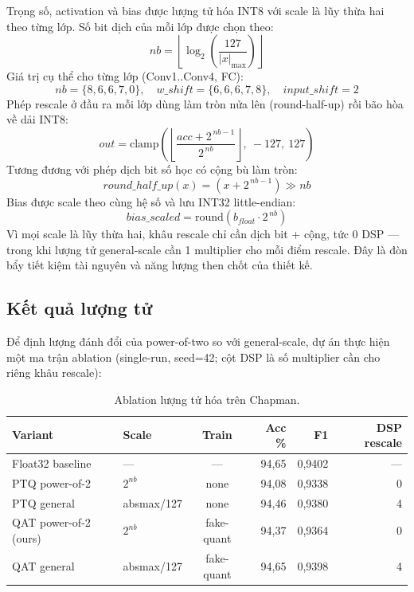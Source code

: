 \documentclass[12pt,a4paper]{article}
\begin{document}
Trọng số, activation và bias được lượng tử hóa INT8 với scale là lũy thừa hai theo từng lớp.
Số bit dịch của mỗi lớp được chọn theo:
\begin{equation}
  nb = \left\lfloor \log_2\!\left(\frac{127}{|x|_{\max}}\right) \right\rfloor
\end{equation}
Giá trị cụ thể cho từng lớp (Conv1..Conv4, FC):
\begin{equation}
  nb = \{8,6,6,7,0\}, \quad w\_shift = \{6,6,6,7,8\}, \quad input\_shift = 2
\end{equation}
Phép rescale ở đầu ra mỗi lớp dùng làm tròn nửa lên (round-half-up) rồi bão hòa về dải INT8:
\begin{equation}
  out = \mathrm{clamp}\!\left( \left\lfloor \frac{acc + 2^{\,nb-1}}{2^{\,nb}} \right\rfloor,\ -127,\ 127 \right)
\end{equation}
Tương đương với phép dịch bit số học có cộng bù làm tròn:
\begin{equation}
  round\_half\_up(x) = (x + 2^{\,nb-1}) \gg nb
\end{equation}
Bias được scale theo cùng hệ số và lưu INT32 little-endian:
\begin{equation}
  bias\_scaled = \mathrm{round}\!\left( b_{float} \cdot 2^{\,nb} \right)
\end{equation}
Vì mọi scale là lũy thừa hai, khâu rescale chỉ cần dịch bit + cộng, tức 0 DSP --- trong khi
lượng tử general-scale cần 1 multiplier cho mỗi điểm rescale. Đây là đòn bẩy tiết kiệm tài
nguyên và năng lượng then chốt của thiết kế.

\subsection{Kết quả lượng tử}

Để định lượng đánh đổi của power-of-two so với general-scale, dự án thực hiện một ma trận
ablation (single-run, seed=42; cột DSP là số multiplier cần cho riêng khâu rescale):

\begin{table}[h]
\centering
\caption{Ablation lượng tử hóa trên Chapman.}
\begin{tabular}{llcrrr}
\toprule
\textbf{Variant} & \textbf{Scale} & \textbf{Train} & \textbf{Acc \%} & \textbf{F1} & \textbf{DSP rescale}\\
\midrule
Float32 baseline & --- & --- & 94,65 & 0,9402 & ---\\
PTQ power-of-2 & $2^{nb}$ & none & 94,08 & 0,9338 & 0\\
PTQ general & absmax/127 & none & 94,46 & 0,9380 & 4\\
QAT power-of-2 (ours) & $2^{nb}$ & fake-quant & 94,37 & 0,9364 & 0\\
QAT general & absmax/127 & fake-quant & 94,65 & 0,9398 & 4\\
\bottomrule
\end{tabular}
\end{table}
\end{document}
